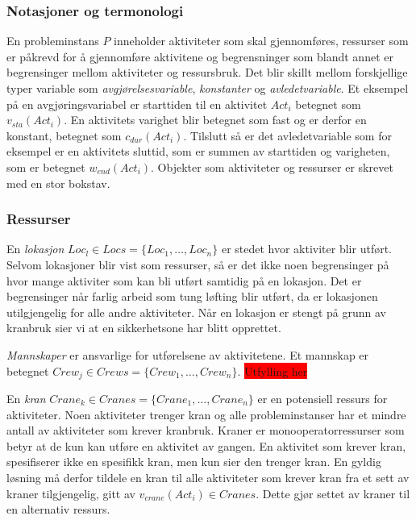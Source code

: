 \subsubsection{Notasjoner og termonologi}
En probleminstans $ P $ inneholder aktiviteter som skal gjennomføres, ressurser som er påkrevd for å gjennomføre aktivitene og begrensninger som blandt annet er begrensinger mellom aktiviteter og ressursbruk. Det blir skillt mellom forskjellige typer variable som \textit{avgjørelsesvariable}, \textit{konstanter} og \textit{avledetvariable}. Et eksempel på en avgjøringsvariabel er starttiden til en aktivitet $ Act_{i} $ betegnet som $ v_{sta}(Act_{i}) $. En aktivitets varighet blir betegnet som fast og er derfor en konstant, betegnet som $ c_{dur}(Act_{i}) $. Tilslutt så er det avledetvariable som for eksempel er en aktivitets sluttid, som er summen av starttiden og varigheten, som er betegnet $ w_{end}(Act_{i}) $. Objekter som aktiviteter og ressurser er skrevet med en stor bokstav.

\subsubsection{Ressurser}
En \textit{lokasjon} $ Loc_{l} \in Locs = \{ Loc_{1},\dots,Loc_{n} \} $ er stedet hvor aktiviter blir utført. Selvom lokasjoner blir vist som ressurser, så er det ikke noen begrensinger på hvor mange aktiviter som kan bli utført samtidig på en lokasjon. Det er begrensinger når farlig arbeid som tung løfting blir utført, da er lokasjonen utilgjengelig for alle andre aktiviteter. Når en lokasjon er stengt på grunn av kranbruk sier vi at en sikkerhetsone har blitt opprettet.

\textit{Mannskaper} er ansvarlige for utførelsene av aktivitetene. Et mannskap er betegnet $ Crew_{j} \in Crews = \{ Crew_{1},\dots,Crew_{n} \} $. \colorbox{red}{Utfylling her}

En \textit{kran} $ Crane_{k} \in Cranes = \{ Crane_{1},\dots,Crane_{n} \} $ er en potensiell ressurs for aktiviteter. Noen aktiviteter trenger kran og alle probleminstanser har et mindre antall av aktiviteter som krever kranbruk. Kraner er monooperatorressurser  som betyr at de kun kan utføre en aktivitet av gangen. En aktivitet som krever kran, spesifiserer ikke en spesifikk kran, men kun sier den trenger kran. En gyldig løsning må derfor tildele en kran til alle aktiviteter som krever kran fra et sett av kraner tilgjengelig, gitt av $ v_{crane}(Act_{i}) \in Cranes $. Dette gjør settet av kraner til en alternativ ressurs.

